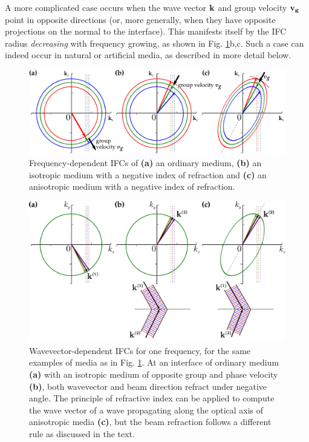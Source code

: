 A more complicated case occurs when the wave vector ${\mathbf{k}}$ and group velocity ${\mathbf{v_g}}$ point in opposite directions (or, more generally, when they have opposite projections on the normal to the interface).  This manifests itself by the IFC radius \textit{decreasing} with frequency growing, as shown in  Fig. \ref{fg_ifcnr}b,c.
Such a case can indeed occur in natural or artificial media, as described in more detail below. 
\begin{figure}[ht] \caption{Frequency-dependent IFCs of \textbf{(a)} an ordinary medium, \textbf{(b)} an isotropic medium with a negative index of refraction and \textbf{(c)} an anisotropic medium with a negative index of refraction. } \label{fg_ifcnr} \centering  %
	\includegraphics[width=.9\textwidth]{img/ifc_negrefr.pdf} 
\end{figure}
\begin{figure}[ht] \caption{Wavevector-dependent IFCs for one frequency, for the same examples of media as in Fig. \ref{fg_ifcnr}. At an interface of ordinary medium \textbf{(a)} with an isotropic medium of opposite group and phase velocity \textbf{(b)}, both wavevector and beam direction refract under negative angle. The principle of refractive index can be applied to compute the wave vector of a wave propagating along the optical axis of anisotropic media \textbf{(c)}, but the beam refraction follows a different rule as discussed in the text.} \label{fg_ifcnrk} \centering  
	\includegraphics[width=.9\textwidth]{img/ifc_negrefrk.pdf} 
\end{figure}

